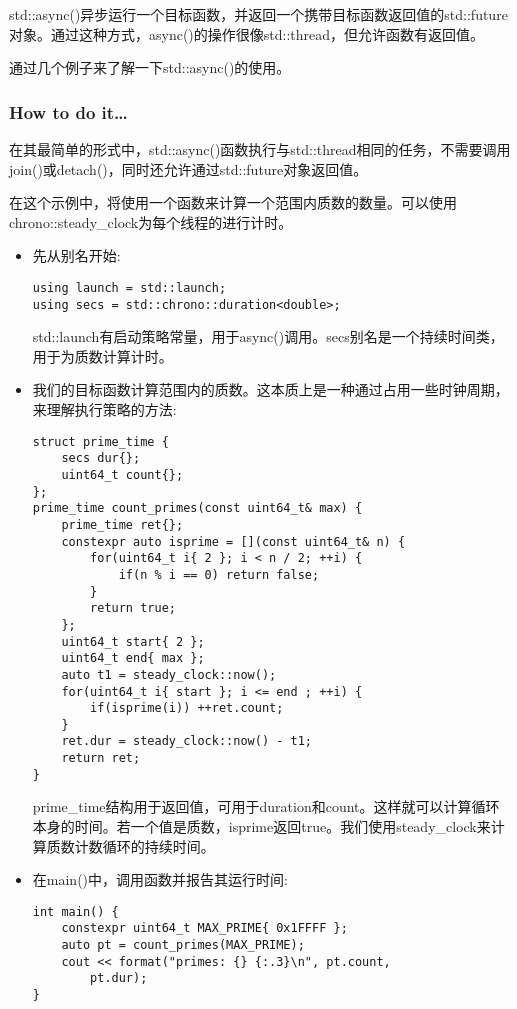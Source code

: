 
std::async()异步运行一个目标函数，并返回一个携带目标函数返回值的std::future对象。通过这种方式，async()的操作很像std::thread，但允许函数有返回值。

通过几个例子来了解一下std::async()的使用。

\subsubsection{How to do it…}

在其最简单的形式中，std::async()函数执行与std::thread相同的任务，不需要调用join()或detach()，同时还允许通过std::future对象返回值。

在这个示例中，将使用一个函数来计算一个范围内质数的数量。可以使用chrono::steady\_clock为每个线程的进行计时。

\begin{itemize}
\item 
先从别名开始:

\begin{lstlisting}[style=styleCXX]
using launch = std::launch;
using secs = std::chrono::duration<double>;
\end{lstlisting}

std::launch有启动策略常量，用于async()调用。secs别名是一个持续时间类，用于为质数计算计时。

\item 
我们的目标函数计算范围内的质数。这本质上是一种通过占用一些时钟周期，来理解执行策略的方法:

\begin{lstlisting}[style=styleCXX]
struct prime_time {
	secs dur{};
	uint64_t count{};
};
prime_time count_primes(const uint64_t& max) {
	prime_time ret{};
	constexpr auto isprime = [](const uint64_t& n) {
		for(uint64_t i{ 2 }; i < n / 2; ++i) {
			if(n % i == 0) return false;
		}
		return true;
	};
	uint64_t start{ 2 };
	uint64_t end{ max };
	auto t1 = steady_clock::now();
	for(uint64_t i{ start }; i <= end ; ++i) {
		if(isprime(i)) ++ret.count;
	}
	ret.dur = steady_clock::now() - t1;
	return ret;
}
\end{lstlisting}

prime\_time结构用于返回值，可用于duration和count。这样就可以计算循环本身的时间。若一个值是质数，isprime返回true。我们使用steady\_clock来计算质数计数循环的持续时间。

\item 
在main()中，调用函数并报告其运行时间:

\begin{lstlisting}[style=styleCXX]
int main() {
	constexpr uint64_t MAX_PRIME{ 0x1FFFF };
	auto pt = count_primes(MAX_PRIME);
	cout << format("primes: {} {:.3}\n", pt.count,
		pt.dur);
}
\end{lstlisting}


\end{itemize}
